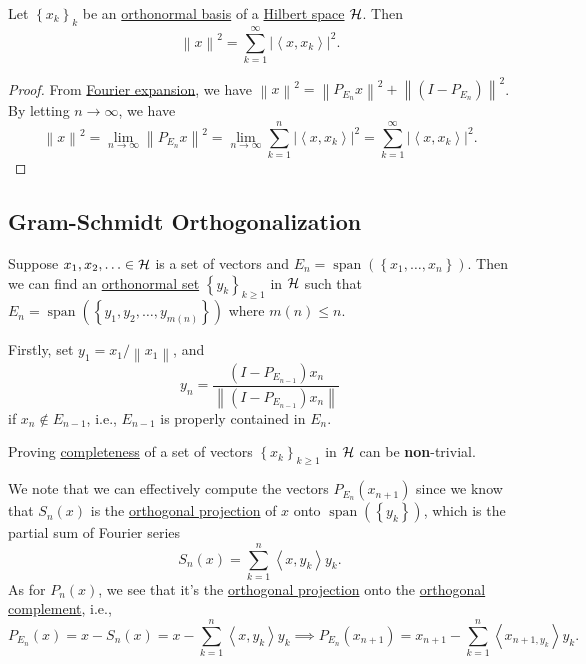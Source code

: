 \begin{corollary}\label{col:Parseval}
	Let \(\left\{ x_k \right\} _k\) be an \hyperref[def:orthonormal-basis]{orthonormal basis} of a \hyperref[def:Hilbert-space]{Hilbert space} \(\mathcal{\MakeUppercase{h}} \). Then
	\[
		\left\lVert x\right\rVert ^{2} = \sum_{k=1}^{\infty} \left\vert \left\langle x, x_k \right\rangle  \right\vert ^{2} .
	\]
\end{corollary}
\begin{proof}
	From \hyperref[thm:Fourier-expansion]{Fourier expansion}, we have \(\left\lVert x\right\rVert ^{2} = \left\lVert P_{E_n} x \right\rVert^{2} + \left\lVert (I - P_{E_{n} })\right\rVert ^{2}\). By letting \(n \to \infty \), we have
	\[
		\left\lVert x\right\rVert^{2} = \lim\limits_{n \to \infty} \left\lVert P_{E_n}x\right\rVert ^{2} = \lim\limits_{n \to \infty} \sum_{k=1}^{n} \left\vert \left\langle x, x_{k}  \right\rangle  \right\vert ^{2} = \sum_{k=1}^{\infty} \left\vert \left\langle x, x_{k}  \right\rangle  \right\vert  ^{2}.
	\]
\end{proof}

\subsection{Gram-Schmidt Orthogonalization}

Suppose \(x_1, x_2, \ldots \in \mathcal{\MakeUppercase{h}}\) is a set of vectors and \(E_n = \mathop{\mathrm{span}}(\left\{ x_1, \ldots , x_n \right\} )\). Then we can find an \hyperref[def:orthonormal-system]{orthonormal set} \(\left\{ y_{k} \right\}_{k\geq 1}\) in \(\mathcal{\MakeUppercase{h}}\) such that \(E_n = \mathop{\mathrm{span}}(\left\{ y_1, y_2, \ldots , y_{m(n)}  \right\} )\) where \(m(n) \leq n\).

Firstly, set \(y_1 = x_1 / \left\lVert x_1\right\rVert \), and
\[
	y_n = \frac{(I - P_{E_{n-1}})x_n}{\left\lVert (I - P_{E_{n-1}})x_n \right\rVert}
\]
if \(x_n \notin E_{n-1}\), i.e., \(E_{n-1}\) is properly contained in \(E_n\).

\begin{remark}
	Proving \hyperref[def:complete-system]{completeness} of a set of vectors \(\left\{ x_k \right\}_{k\geq 1} \) in \(\mathcal{\MakeUppercase{h}} \) can be \textbf{non}-trivial.
\end{remark}

We note that we can effectively compute the vectors \(P_{E_n} (x_{n+1}) \) since we know that \(S_n(x)\) is the \hyperref[def:orthogonal-projection]{orthogonal projection} of \(x\) onto \(\mathop{\mathrm{span}}(\left\{ y_k \right\} )\), which is the partial sum of Fourier series
\[
	S_n(x) = \sum_{k=1} ^n \left\langle x, y_k \right\rangle y_k.
\]
As for \(P_n(x)\), we see that it's the \hyperref[def:orthogonal-projection]{orthogonal projection} onto the \hyperref[def:orthogonal-complement]{orthogonal complement}, i.e.,
\[
	P_{E_n}(x) = x - S_n(x) = x - \sum_{k=1} ^n \left\langle x, y_{k}  \right\rangle y_{k} \implies P_{E_n}(x_{n+1} ) = x_{n+1} - \sum\limits_{k=1}^{n} \left\langle x_{n+1, y_{k} }  \right\rangle  y_{k}.
\]

